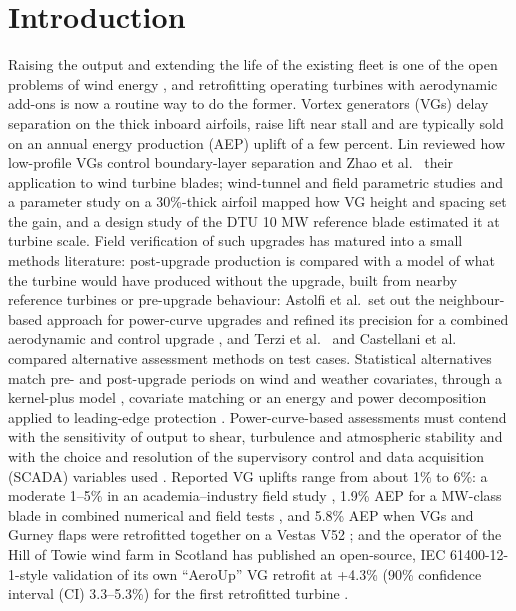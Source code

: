 \documentclass[preprint,12pt]{elsarticle}
\begin{document}
\linenumbers

\section{Introduction}

Raising the output and extending the life of the existing fleet is one of the open problems of wind energy \cite{veers19}, and retrofitting operating turbines with aerodynamic add-ons is now a routine way to do the former. Vortex generators (VGs) delay separation on the thick inboard airfoils, raise lift near stall and are typically sold on an annual energy production (AEP) uplift of a few percent. Lin \cite{lin02} reviewed how low-profile VGs control boundary-layer separation and Zhao et al.~\cite{zhao} their application to wind turbine blades; wind-tunnel and field parametric studies \cite{mueller} and a parameter study on a 30\%-thick airfoil \cite{baldacchino18} mapped how VG height and spacing set the gain, and a design study of the DTU 10 MW reference blade \cite{skrzypinski14} estimated it at turbine scale. Field verification of such upgrades has matured into a small methods literature: post-upgrade production is compared with a model of what the turbine would have produced without the upgrade, built from nearby reference turbines or pre-upgrade behaviour: Astolfi et al.~set out the neighbour-based approach for power-curve upgrades \cite{astolfi18} and refined its precision for a combined aerodynamic and control upgrade \cite{astolfi19}, and Terzi et al.~\cite{terzi} and Castellani et al.~\cite{castellani} compared alternative assessment methods on test cases. Statistical alternatives match pre- and post-upgrade periods on wind and weather covariates, through a kernel-plus model \cite{lee15}, covariate matching \cite{shin18} or an energy and power decomposition applied to leading-edge protection \cite{latiffianti22}. Power-curve-based assessments must contend with the sensitivity of output to shear, turbulence and atmospheric stability \cite{wagner09,stmartin16} and with the choice and resolution of the supervisory control and data acquisition (SCADA) variables used \cite{gonzalez19,astolfi21}. Reported VG uplifts range from about 1\% to 6\%: a moderate 1--5\% in an academia--industry field study \cite{hwangbo17}, 1.9\% AEP for a MW-class blade in combined numerical and field tests \cite{moon}, and 5.8\% AEP when VGs and Gurney flaps were retrofitted together on a Vestas V52 \cite{manolesos}; and the operator of the Hill of Towie wind farm in Scotland has published an open-source, IEC 61400-12-1-style \cite{iec} validation of its own ``AeroUp'' VG retrofit at +4.3\% (90\% confidence interval (CI) 3.3--5.3\%) for the first retrofitted turbine \cite{clerc}.
\end{document}
